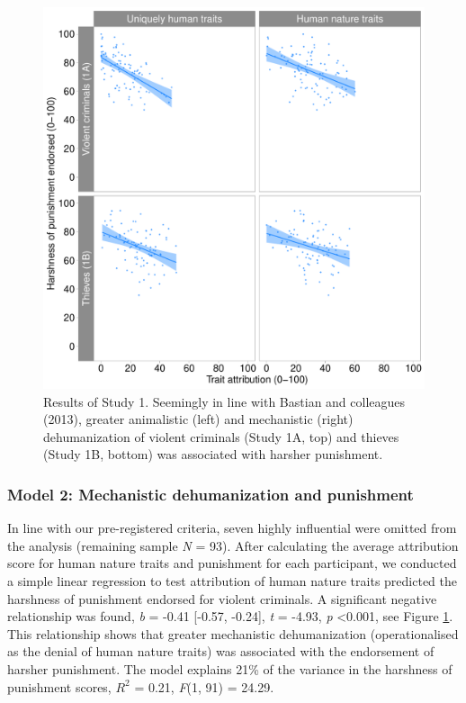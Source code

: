 \documentclass[
]{article}
\begin{document}
\begin{figure}

{\centering \includegraphics{figures/plot1} 

}

\caption{Results of Study 1. Seemingly in line with Bastian and colleagues (2013), greater animalistic (left) and mechanistic (right) dehumanization of violent criminals (Study 1A, top) and thieves (Study 1B, bottom) was associated with harsher punishment.}\label{fig:figure1}
\end{figure}

\hypertarget{model-2-mechanistic-dehumanization-and-punishment}{%
\subsubsection{Model 2: Mechanistic dehumanization and punishment}\label{model-2-mechanistic-dehumanization-and-punishment}}

In line with our pre-registered criteria, seven highly influential were omitted from the analysis (remaining sample \emph{N} = 93). After calculating the average attribution score for human nature traits and punishment for each participant, we conducted a simple linear regression to test attribution of human nature traits predicted the harshness of punishment endorsed for violent criminals. A significant negative relationship was found, \emph{b} = -0.41 {[}-0.57, -0.24{]}, \emph{t} = -4.93, \emph{p} \textless0.001, see Figure \ref{fig:figure1}. This relationship shows that greater mechanistic dehumanization (operationalised as the denial of human nature traits) was associated with the endorsement of harsher punishment. The model explains 21\% of the variance in the harshness of punishment scores, \(R^2\) = 0.21, \emph{F}(1, 91) = 24.29.
\end{document}

